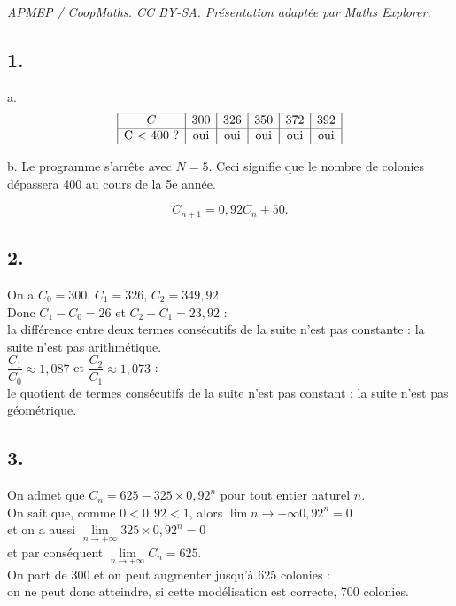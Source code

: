 \documentclass[10pt]{article}
\begin{document}
\noindent\textit{APMEP / CoopMaths. CC BY-SA. Présentation adaptée par Maths Explorer.}\par\medskip
\subsection*{1.}
	a.	
	\[
	\begin{array}{|c|c|c|c|c|c|}
		\hline
		C & 300 & 326 & 350 & 372 & 392 \\
		\hline
		\text{C < 400 ?} & \text{oui} & \text{oui} & \text{oui} & \text{oui} & \text{oui} \\
		\hline
	\end{array}
	\]
	
	b. Le programme s’arrête avec \(N = 5\). Ceci signifie que le nombre de colonies dépassera 400 au cours de la 5e année.
	
	\[
	C_{n+1} = 0,92 C_n + 50.
	\]
	
	\subsection*{2.}
	

		On a $C_0 = 300$, \quad $C_1 = 326$, \quad $C_2 = 349,92$. \\
Donc  $C_1 - C_0 = 26$  et $C_2 - C_1 = 23,92$ :\\
 la différence entre deux termes consécutifs de la suite n’est pas constante : la suite n’est pas arithmétique. \\
		$\dfrac{C_1}{C_0} \approx 1,087$  et $\dfrac{C_2}{C_1} \approx 1,073$ :\\
		 le quotient de termes consécutifs de la suite n’est pas constant : la suite n’est pas géométrique.

	
	\subsection*{3.}
	
	On admet que \(C_n = 625 - 325 \times 0,92^n\) pour tout entier naturel \(n\).\\
	On sait que, comme \(0 < 0,92 < 1\), alors \(\lim\limits{n \to +\infty} 0,92^n = 0\)\\
	 et on a aussi $\lim\limits_{n \to +\infty} 325 \times 0,92^n = 0$ \\
	 et par conséquent $\lim\limits_{n \to +\infty} C_n = 625$.\\
	 On part de 300 et on peut augmenter jusqu’à 625 colonies :\\ on ne peut donc atteindre, si cette modélisation est correcte, 700 colonies.
\end{document}
